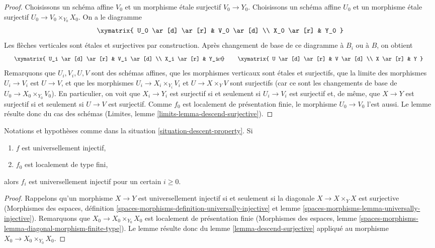 \begin{proof}
Choisissons un schéma affine $V_0$ et un morphisme étale surjectif
$V_0 \to Y_0$. Choisissons un schéma affine $U_0$ et un morphisme étale
surjectif $U_0 \to V_0 \times_{Y_0} X_0$. On a le diagramme
$$
\xymatrix{
U_0 \ar[d] \ar[r] & V_0 \ar[d] \\
X_0 \ar[r] & Y_0
}
$$
Les flèches verticales sont étales et surjectives par construction.
Après changement de base de ce diagramme à $B_i$ ou à $B$, on obtient
$$
\vcenter{
\xymatrix{
U_i \ar[d] \ar[r] & V_i \ar[d] \\
X_i \ar[r] & Y_i
}
}
\quad\text{et}\quad
\vcenter{
\xymatrix{
U \ar[d] \ar[r] & V \ar[d] \\
X \ar[r] & Y
}
}
$$
Remarquons que $U_i, V_i, U, V$ sont des schémas affines, que les morphismes verticaux sont
étales et surjectifs, que la limite des morphismes $U_i \to V_i$ est $U \to V$,
et que les morphismes $U_i \to X_i \times_{Y_i} V_i$ et
$U \to X \times_Y V$ sont surjectifs (car ce sont les changements de base de
$U_0 \to X_0 \times_{Y_0} V_0$). En particulier, on voit que
$X_i \to Y_i$ est surjectif si et seulement si $U_i \to V_i$ est surjectif
et, de même, que $X \to Y$ est surjectif si et seulement si $U \to V$ est surjectif.
Comme $f_0$ est localement de présentation
finie, le morphisme $U_0 \to V_0$ l'est aussi. Le lemme résulte donc
du cas des schémas (Limites, lemme \ref{limits-lemma-descend-surjective}).
\end{proof}

\begin{lemma}
\label{lemma-descend-universally-injective}
Notations et hypothèses comme dans la situation \ref{situation-descent-property}. Si
\begin{enumerate}
\item $f$ est universellement injectif,
\item $f_0$ est localement de type fini,
\end{enumerate}
alors $f_i$ est universellement injectif pour un certain $i \geq 0$.
\end{lemma}

\begin{proof}
Rappelons qu'un morphisme $X \to Y$ est universellement injectif si et
seulement si la diagonale $X \to X \times_Y X$ est surjective
(Morphismes des espaces, définition
\ref{spaces-morphisms-definition-universally-injective} et
lemme \ref{spaces-morphisms-lemma-universally-injective}).
Remarquons que $X_0 \to X_0 \times_{Y_0} X_0$ est localement de
présentation finie (Morphismes des espaces, lemme
\ref{spaces-morphisms-lemma-diagonal-morphism-finite-type}).
Le lemme résulte donc du lemme \ref{lemma-descend-surjective}
appliqué au morphisme $X_0 \to X_0 \times_{Y_0} X_0$.
\end{proof}

